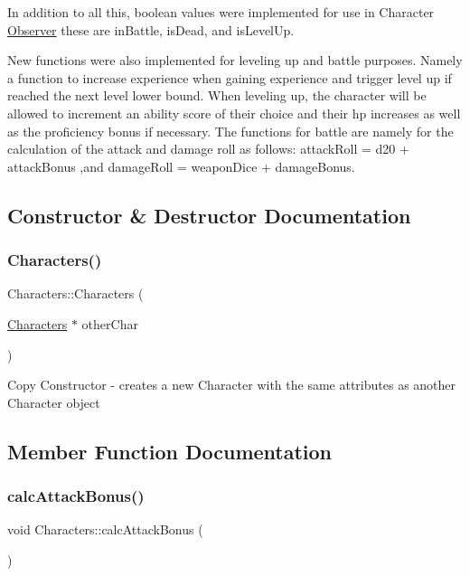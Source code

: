 In addition to all this, boolean values were implemented for use in Character \hyperlink{class_observer}{Observer} these are in\+Battle, is\+Dead, and is\+Level\+Up.

New functions were also implemented for leveling up and battle purposes. Namely a function to increase experience when gaining experience and trigger level up if reached the next level lower bound. When leveling up, the character will be allowed to increment an ability score of their choice and their hp increases as well as the proficiency bonus if necessary. The functions for battle are namely for the calculation of the attack and damage roll as follows\+: attack\+Roll = d20 + attack\+Bonus ,and damage\+Roll = weapon\+Dice + damage\+Bonus. 

\subsection{Constructor \& Destructor Documentation}
\hypertarget{class_characters_a695ed5b59463f54d4eb52a551a25949b}{}\label{class_characters_a695ed5b59463f54d4eb52a551a25949b} 
\subsubsection{\texorpdfstring{Characters()}{Characters()}}
{\footnotesize\ttfamily Characters\+::\+Characters (\begin{DoxyParamCaption}\item[{\hyperlink{class_characters}{Characters} $\ast$}]{other\+Char }\end{DoxyParamCaption})}

Copy Constructor -\/ creates a new Character with the same attributes as another Character object 

\subsection{Member Function Documentation}
\hypertarget{class_characters_aafcca03cc72ce2b389c0412229864c6e}{}\label{class_characters_aafcca03cc72ce2b389c0412229864c6e} 
\subsubsection{\texorpdfstring{calc\+Attack\+Bonus()}{calcAttackBonus()}}
{\footnotesize\ttfamily void Characters\+::calc\+Attack\+Bonus (\begin{DoxyParamCaption}{ }\end{DoxyParamCaption})}

